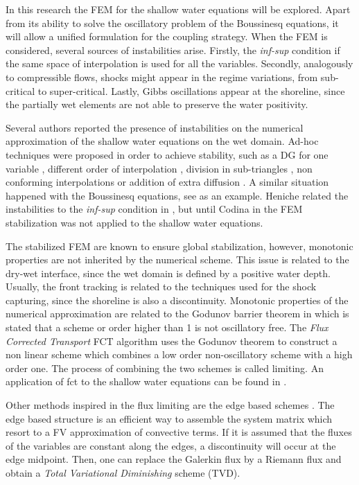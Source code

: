 In this research the FEM for the shallow water equations will be explored. Apart from its ability to solve the oscillatory problem of the Boussinesq equations, it will allow a unified formulation for the coupling strategy. When the FEM is considered, several sources of instabilities arise. Firstly, the \emph{inf-sup} condition if the same space of interpolation is used for all the variables. Secondly, analogously to compressible flows, shocks might appear in the regime variations, from sub-critical to super-critical. Lastly, Gibbs oscillations appear at the shoreline, since the partially wet elements are not able to preserve the water positivity.

Several authors reported the presence of instabilities on the numerical approximation of the shallow water equations on the wet domain. Ad-hoc techniques were proposed in order to achieve stability, such as a DG for one variable \cite{gourgue2009}, different order of interpolation \cite{leclerc1990}, division in sub-triangles \cite{heniche2000}, non conforming interpolations \cite{hanert2005} or addition of extra diffusion \cite{defina2000}. A similar situation happened with the Boussinesq equations, see \cite{walkley2002,woo2004a} as an example. Heniche related the instabilities to the \emph{inf-sup} condition in \cite{heniche2000}, but until Codina in \cite{codina2008} the FEM stabilization was not applied to the shallow water equations.

The stabilized FEM are known to ensure global stabilization, however, monotonic properties are not inherited by the numerical scheme. This issue is related to the dry-wet interface, since the wet domain is defined by a positive water depth. Usually, the front tracking is related to the techniques used for the shock capturing, since the shoreline is also a discontinuity.
Monotonic properties of the numerical approximation are related to the Godunov barrier theorem \cite{godunov1959} in which is stated that a scheme or order higher than 1 is not oscillatory free. The \emph{Flux Corrected Transport} FCT algorithm \cite{lohner2008ch9} uses the Godunov theorem to construct a non linear scheme which combines a low order non-oscillatory scheme with a high order one. The process of combining the two schemes is called limiting. An application of fct to the shallow water equations can be found in \cite{ortiz2012}.

Other methods inspired in the flux limiting are the edge based schemes \cite{lohner2008ch10}. The edge based structure is an efficient way to assemble the system matrix which resort to a FV approximation of convective terms. If it is assumed that the fluxes of the variables are constant along the edges, a discontinuity will occur at the edge midpoint. Then, one can replace the Galerkin flux by a Riemann flux and obtain a \emph{Total Variational Diminishing} scheme (TVD).

